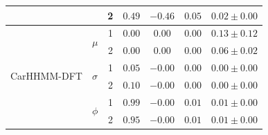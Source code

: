 \documentclass[12pt]{TD-CJS}
\begin{document}
\begin{table}
{\begin{tabular}{ccccccc}
                           &                               & 2                             & $0.49$                         & $-0.46$                     & $0.05$                             & $0.02 \pm 0.00$                             \\ \hline
\multirow{6}{*}{CarHHMM-DFT}& \multirow{2}{*}{$\mu$}        & 1                             & $0.00$                         & $0.00$                     & $0.00$                             & $0.13 \pm 0.12$                             \\
                           &                               & 2                             & $0.00$                         & $0.00$                     & $0.00$                             & $0.06 \pm 0.02$                             \\
                           & \multirow{2}{*}{$\sigma$}     & 1                             & $0.05$                         & $-0.00$                     & $0.00$                             & $0.00 \pm 0.00$                             \\
                           &                               & 2                             & $0.10$                         & $-0.00$                     & $0.00$                             & $0.00 \pm 0.00$                             \\ 
                           & \multirow{2}{*}{$\phi$}       & 1                             & $0.99$                         & $-0.00$                     & $0.01$                             & $0.01 \pm 0.00$                             \\
                           &                               & 2                             & $0.95$                         & $-0.00$                     & $0.01$                             & $0.01 \pm 0.00$                             \\ \hline
\end{tabular}
}
\label{table:acceleration}
\end{table}


\end{document}
